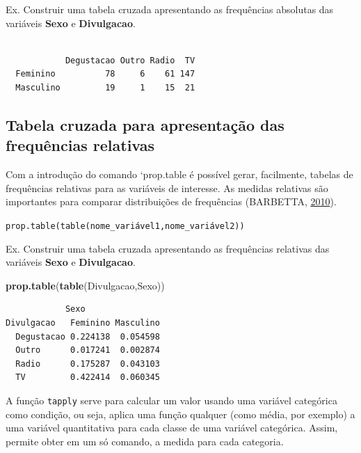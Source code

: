 \documentclass[12pt,brazil,oneside]{book}
\newenvironment{Shaded}{\begin{snugshade}}{\end{snugshade}}
\newcommand{\KeywordTok}[1]{\textcolor[rgb]{0.13,0.29,0.53}{\textbf{#1}}}
\newcommand{\NormalTok}[1]{#1}
\newcommand{\OperatorTok}[1]{\textcolor[rgb]{0.81,0.36,0.00}{\textbf{#1}}}
\begin{document}
Ex. Construir uma tabela cruzada apresentando as frequências absolutas
das variáveis \textbf{Sexo} e \textbf{Divulgacao}.

\begin{Shaded}
\end{Shaded}

\begin{verbatim}
           
            Degustacao Outro Radio  TV
  Feminino          78     6    61 147
  Masculino         19     1    15  21
\end{verbatim}

\hypertarget{tabela-cruzada-para-apresentacao-das-frequencias-relativas}{%
\subsection{Tabela cruzada para apresentação das frequências
relativas}\label{tabela-cruzada-para-apresentacao-das-frequencias-relativas}}

Com a introdução do comando `prop.table\textbar{} é possível gerar,
facilmente, tabelas de frequências relativas para as variáveis de
interesse. As medidas relativas são importantes para comparar
distribuições de frequências (BARBETTA,
\protect\hyperlink{ref-barbetta1988}{2010}).

\texttt{prop.table(table(nome\_variável1,nome\_variável2))}

Ex. Construir uma tabela cruzada apresentando as frequências relativas
das variáveis \textbf{Sexo} e \textbf{Divulgacao}.

\begin{Shaded}
\begin{Highlighting}[]
\KeywordTok{prop.table}\NormalTok{(}\KeywordTok{table}\NormalTok{(Divulgacao,Sexo))}
\end{Highlighting}
\end{Shaded}

\begin{verbatim}
            Sexo
Divulgacao   Feminino Masculino
  Degustacao 0.224138  0.054598
  Outro      0.017241  0.002874
  Radio      0.175287  0.043103
  TV         0.422414  0.060345
\end{verbatim}

A função \texttt{tapply} serve para calcular um valor usando uma
variável categórica como condição, ou seja, aplica uma função qualquer
(como média, por exemplo) a uma variável quantitativa para cada classe
de uma variável categórica. Assim, permite obter em um só comando, a
medida para cada categoria.
\end{document}
